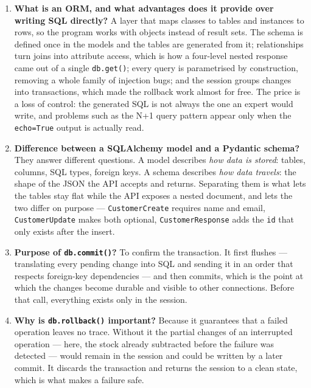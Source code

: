 \documentclass[10pt,a4paper]{article}
\begin{document}
\begin{enumerate}[leftmargin=0.7cm]

\item \textbf{What is an ORM, and what advantages does it provide over writing
SQL directly?} A layer that maps classes to tables and instances to rows, so the
program works with objects instead of result sets. The schema is defined once in
the models and the tables are generated from it; relationships turn joins into
attribute access, which is how a four-level nested response came out of a single
\texttt{db.get()}; every query is parametrised by construction, removing a whole
family of injection bugs; and the session groups changes into transactions,
which made the rollback work almost for free. The price is a loss of control:
the generated SQL is not always the one an expert would write, and problems such
as the N+1 query pattern appear only when the \texttt{echo=True} output is
actually read.

\item \textbf{Difference between a SQLAlchemy model and a Pydantic schema?} They
answer different questions. A model describes \emph{how data is stored}: tables,
columns, SQL types, foreign keys. A schema describes \emph{how data travels}:
the shape of the JSON the API accepts and returns. Separating them is what lets
the tables stay flat while the API exposes a nested document, and lets the two
differ on purpose --- \texttt{CustomerCreate} requires name and email,
\texttt{CustomerUpdate} makes both optional, \texttt{CustomerResponse} adds the
\texttt{id} that only exists after the insert.

\item \textbf{Purpose of \texttt{db.commit()}?} To confirm the transaction. It
first flushes --- translating every pending change into SQL and sending it in an
order that respects foreign-key dependencies --- and then commits, which is the
point at which the changes become durable and visible to other connections.
Before that call, everything exists only in the session.

\item \textbf{Why is \texttt{db.rollback()} important?} Because it guarantees
that a failed operation leaves no trace. Without it the partial changes of an
interrupted operation --- here, the stock already subtracted before the failure
was detected --- would remain in the session and could be written by a later
commit. It discards the transaction and returns the session to a clean state,
which is what makes a failure safe.


\end{enumerate}
\end{document}
